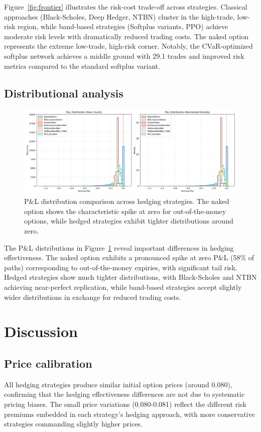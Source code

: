 \documentclass[11pt,letterpaper]{article}
\begin{document}
Figure~\ref{fig:frontier} illustrates the risk-cost trade-off across strategies. Classical approaches (Black-Scholes, Deep Hedger, NTBN) cluster in the high-trade, low-risk region, while band-based strategies (Softplus variants, PPO) achieve moderate risk levels with dramatically reduced trading costs. The naked option represents the extreme low-trade, high-risk corner. Notably, the CVaR-optimized softplus network achieves a middle ground with 29.1 trades and improved risk metrics compared to the standard softplus variant.

\subsection{Distributional analysis}
\begin{figure}[h]
  \centering
  \includegraphics[width=\linewidth]{figures/pnl_hist.png}
  \caption{P\&L distribution comparison across hedging strategies. The naked option shows the characteristic spike at zero for out-of-the-money options, while hedged strategies exhibit tighter distributions around zero.}
  \label{fig:distributions}
\end{figure}

The P\&L distributions in Figure~\ref{fig:distributions} reveal important differences in hedging effectiveness. The naked option exhibits a pronounced spike at zero P\&L (58\% of paths) corresponding to out-of-the-money expiries, with significant tail risk. Hedged strategies show much tighter distributions, with Black-Scholes and NTBN achieving near-perfect replication, while band-based strategies accept slightly wider distributions in exchange for reduced trading costs.

\section{Discussion}
\subsection{Price calibration}
All hedging strategies produce similar initial option prices (around 0.080), confirming that the hedging effectiveness differences are not due to systematic pricing biases. The small price variations (0.080-0.081) reflect the different risk premiums embedded in each strategy's hedging approach, with more conservative strategies commanding slightly higher prices.
\end{document}
